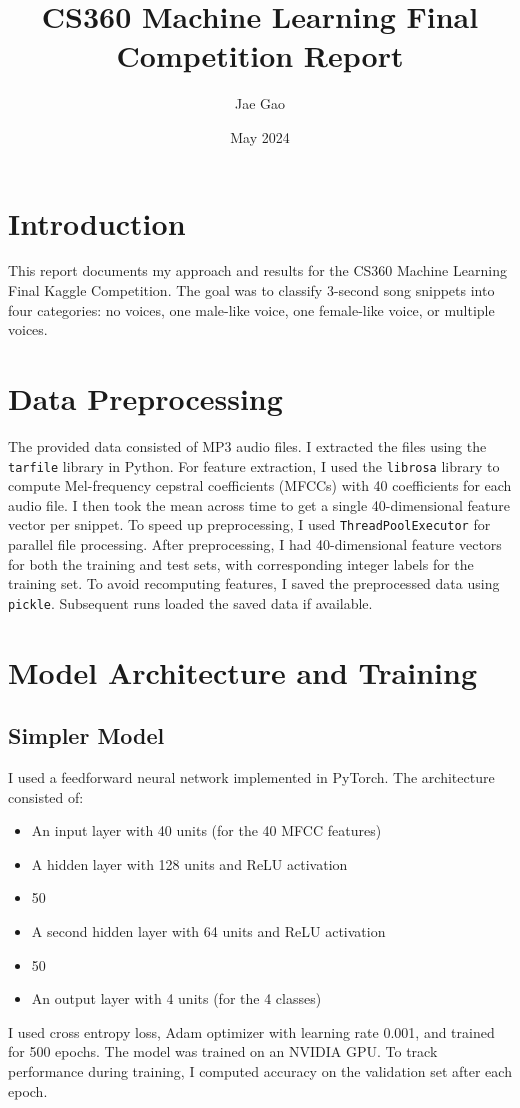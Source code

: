 \documentclass{article}
\title{CS360 Machine Learning Final Competition Report}
\author{Jae Gao}
\date{May 2024}
\begin{document}
\maketitle
\section{Introduction}
This report documents my approach and results for the CS360 Machine Learning Final Kaggle Competition. The goal was to classify 3-second song snippets into four categories: no voices, one male-like voice, one female-like voice, or multiple voices.
\section{Data Preprocessing}
The provided data consisted of MP3 audio files. I extracted the files using the \texttt{tarfile} library in Python. For feature extraction, I used the \texttt{librosa} library to compute Mel-frequency cepstral coefficients (MFCCs) with 40 coefficients for each audio file. I then took the mean across time to get a single 40-dimensional feature vector per snippet.
To speed up preprocessing, I used \texttt{ThreadPoolExecutor} for parallel file processing. After preprocessing, I had 40-dimensional feature vectors for both the training and test sets, with corresponding integer labels for the training set.
To avoid recomputing features, I saved the preprocessed data using \texttt{pickle}. Subsequent runs loaded the saved data if available.
\section{Model Architecture and Training}
\subsection{Simpler Model}
I used a feedforward neural network implemented in PyTorch. The architecture consisted of:
\begin{itemize}
    \item An input layer with 40 units (for the 40 MFCC features)
    \item A hidden layer with 128 units and ReLU activation
    \item 50%
    \item A second hidden layer with 64 units and ReLU activation
    \item 50%
    \item An output layer with 4 units (for the 4 classes)
\end{itemize}
I used cross entropy loss, Adam optimizer with learning rate 0.001, and trained for 500 epochs. The model was trained on an NVIDIA GPU.
To track performance during training, I computed accuracy on the validation set after each epoch.
\end{document}
